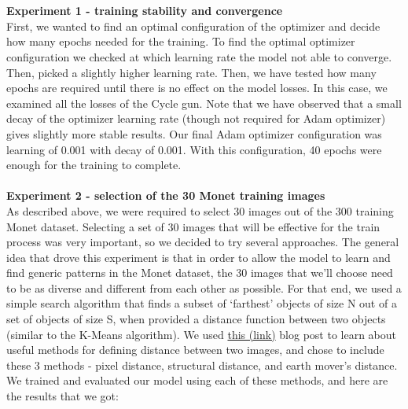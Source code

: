 \documentclass{article}
\begin{document}
\\\\
\newblock
\textbf{Experiment 1 - training stability and convergence}
\\
First, we wanted to find an optimal configuration of the optimizer and decide how many epochs needed for the training.
To find the optimal optimizer configuration we checked at which learning rate the model not able to converge. Then, picked a slightly higher learning rate.
Then, we have tested how many epochs are required until there is no effect on the model losses. In this case, we examined all the losses of the Cycle gun.
Note that we have observed that a small decay of the optimizer learning rate (though not required for Adam optimizer) gives slightly more stable results.
Our final Adam optimizer configuration was learning of 0.001 with decay of 0.001.
With this configuration, 40 epochs were enough for the training to complete.
\\\\
\newblock
\textbf{Experiment 2 - selection of the 30 Monet training images}
\\
As described above, we were required to select 30 images out of the 300 training Monet dataset. Selecting a set of 30 images that will be effective for the train process was very important, so we decided to try several approaches. The general idea that drove this experiment is that in order to allow the model to learn and find generic patterns in the Monet dataset, the 30 images that we’ll choose need to be as diverse and different from each other as possible. For that end, we used a simple search algorithm that finds a subset of ‘farthest’ objects of size N out of a set of objects of size S, when provided a distance function between two objects (similar to the K-Means algorithm). We used \href{https://gist.github.com/duhaime/211365edaddf7ff89c0a36d9f3f7956c}{this (link)} blog post to learn about useful methods for defining distance between two images, and chose to include these 3 methods - pixel distance, structural distance, and earth mover’s distance. We trained and evaluated our model using each of these methods, and here are the results that we got:
\end{document}
